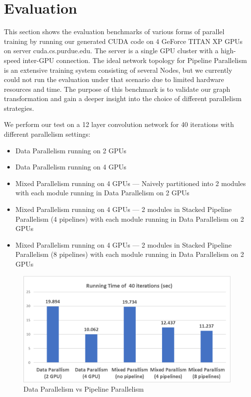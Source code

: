 \documentclass[sigplan, nonacm]{acmart}\settopmatter{printfolios=true,printccs=false,printacmref=false}
\begin{document}
 \section{Evaluation}\label{evaluation}
 This section shows the evaluation benchmarks of various forms of parallel training by running our generated CUDA code on 4 GeForce TITAN XP GPUs on server cuda.cs.purdue.edu. The server is a single GPU cluster with a high-speed inter-GPU connection. The ideal network topology for Pipeline Parallelism is an extensive training system consisting of several Nodes, but we currently could not run the evaluation under that scenario due to limited hardware resources and time. The purpose of this benchmark is to validate our graph transformation and gain a deeper insight into the choice of different parallelism strategies.\par
 We perform our test on a 12 layer convolution network for 40 iterations with different parallelism settings:
 \begin{itemize}
   \item Data Parallelism running on 2 GPUs
   \item Data Parallelism running on 4 GPUs
   \item Mixed Parallelism running on 4 GPUs --- Naively partitioned into 2 modules with each module running in Data Parallelism on 2 GPUs
   \item Mixed Parallelism running on 4 GPUs --- 2 modules in Stacked Pipeline Parallelism (4 pipelines) with each module running in Data Parallelism on 2 GPUs
   \item Mixed Parallelism running on 4 GPUs --- 2 modules in Stacked Pipeline Parallelism (8 pipelines) with each module running in Data Parallelism on 2 GPUs
 \end{itemize}
 \begin{figure}[htbp]
  \centering
  \includegraphics[scale=0.5]{pipelineparallelruntime.png}
  \caption{Data Parallelism vs Pipeline Parallelism}
  \label{fig:runtime}
\end{figure}
\end{document}
